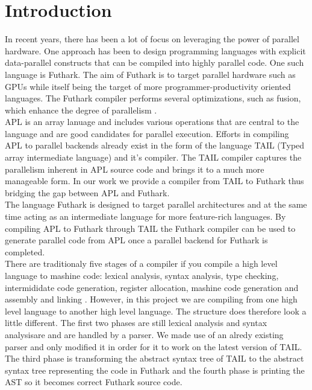 \documentclass[11pt]{article}
\begin{document}
\section{Introduction}

In recent years, there has been a lot of focus on leveraging the power of parallel hardware. 
One approach has been to design programming languages with explicit data-parallel constructs that can be compiled 
into highly parallel code. One such language is Futhark. The aim of Futhark is to target parallel hardware such as 
GPUs while itself being the target of more programmer-productivity oriented languages. The Futhark compiler 
performs several optimizations, such as fusion, which enhance the degree of 
parallelism \cite{T.Henriksen&C.Oancea}.\\

APL is an array lanuage and includes various operations that are central to the language and are good candidates 
for parallel execution. Efforts in compiling APL to parallel backends already exist in the form of the language 
TAIL (Typed array intermediate language) and it’s compiler. The TAIL compiler captures the parallelism inherent in 
APL source code and brings it to a much more manageable form. In our work we provide a compiler from TAIL 
to Futhark thus bridging the gap between APL and Futhark.\\

The language Futhark is designed to target parallel architectures and at the same time acting 
as an intermediate language for more feature-rich languages. By compiling APL to Futhark through TAIL the 
Futhark compiler can be used to generate parallel code from APL once a parallel backend for 
Futhark is completed.\\

There are traditionaly five stages of a compiler if you compile a high level language to mashine code: 
lexical analysis, syntax analysis, type checking, intermididate code generation, register allocation, mashine 
code generation and assembly and linking \cite{TorbenMogensen}. However, in this project we are compiling from 
one high level language to another high level language. The structure does therefore look a little different. 
The first two phases are still lexical analysis and syntax analysisare and are handled by a parser. We made use of an alredy existing parser \cite{APLACC} and only modified it in order for it to work on the latest 
version of TAIL. The third phase is transforming the abstract syntax tree of TAIL to the abstract syntax tree 
representing the code in Futhark and the fourth phase is printing the AST so it becomes correct 
Futhark source code. \\
\end{document}
